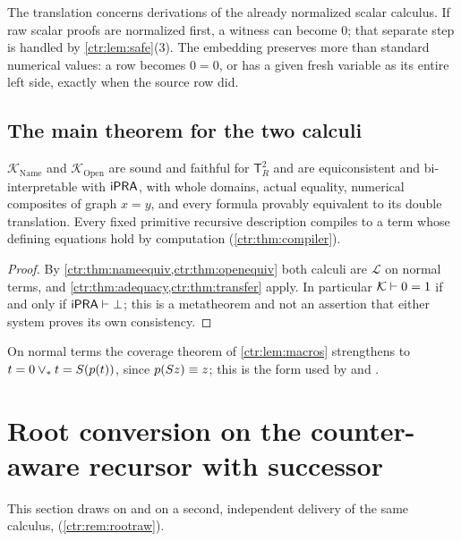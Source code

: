 The translation concerns derivations of the already normalized scalar calculus. If raw
scalar proofs are normalized first, a witness can become $0$; that separate step is handled
by \cref{ctr:lem:safe}(3). The embedding preserves more than standard numerical values: a
row becomes $0=0$, or has a given fresh variable as its entire left side, exactly when the
source row did.

\subsection{The main theorem for the two calculi}

\begin{theorem}\label{ctr:thm:threemain}
$\mathcal K_{\mathrm{Name}}$ and $\mathcal K_{\mathrm{Open}}$ are sound and faithful for
$\mathsf T_R^2$ and are equiconsistent and bi-interpretable with $\mathsf{iPRA}$, with whole
domains, actual equality, numerical composites of graph $x=y$, and every formula provably
equivalent to its double translation. Every fixed primitive recursive description compiles
to a term whose defining equations hold by computation
(\cref{ctr:thm:compiler}).
\end{theorem}
\begin{proof}
By \cref{ctr:thm:nameequiv,ctr:thm:openequiv} both calculi are $\mathcal L$ on normal terms,
and \cref{ctr:thm:adequacy,ctr:thm:transfer} apply. In particular
$\mathcal K\vdash 0=1$ if and only if $\mathsf{iPRA}\vdash\bot$; this is a metatheorem and not an
assertion that either system proves its own consistency.
\end{proof}

On normal terms the coverage theorem of \cref{ctr:lem:macros} strengthens to
$t=0\lor_*t=S(p(t))$, since $p(S z)\equiv z$; this is the form used by
 and .

\section{Root conversion on the counter-aware recursor with successor}\label{ctr:sec:root}

This section draws on  and on a second, independent delivery of the
same calculus,  (\cref{ctr:rem:rootraw}).

